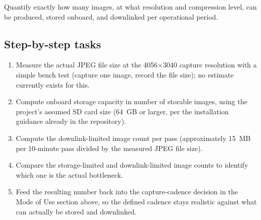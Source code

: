 Quantify exactly how many images, at what resolution and compression level, can be produced, stored onboard, and downlinked per operational period.

\subsection{Step-by-step tasks}

\begin{enumerate}[leftmargin=*]
    \item Measure the actual JPEG file size at the 4056$\times$3040 capture resolution with a simple bench test (capture one image, record the file size); no estimate currently exists for this.
    \item Compute onboard storage capacity in number of storable images, using the project's assumed SD card size (64~GB or larger, per the installation guidance already in the repository).
    \item Compute the downlink-limited image count per pass (approximately 15~MB per 10-minute pass divided by the measured JPEG file size).
    \item Compare the storage-limited and downlink-limited image counts to identify which one is the actual bottleneck.
    \item Feed the resulting number back into the capture-cadence decision in the Mode of Use section above, so the defined cadence stays realistic against what can actually be stored and downlinked.
\end{enumerate}
